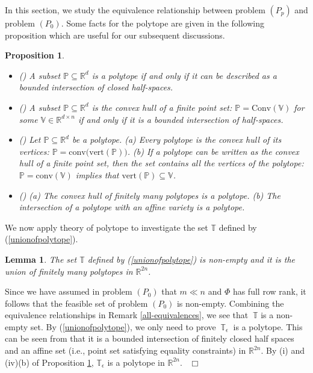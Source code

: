 \documentclass[12pt]{article}
\newtheorem{Proposition}{Proposition}[part]
\newtheorem{Lemma}{Lemma}[part]
\def \ep{\hbox{ }\hfill$\Box$}
\def\reff#1{{\rm(\ref{#1})}}
\begin{document}
\hspace{4mm} In this section, we study the equivalence relationship between problem $(P_p)$ and problem $(P_0)$. Some facts for the polytope are given in the following proposition which are useful for our subsequent discussions.
\begin{Proposition}\label{Representation theorem for polytopes}
\begin{itemize}
\item[(i)] \textrm{\rm (\cite[Theorem 2.15(6)]{Ziegler95bk})}
A subset $\mathbb{P}\subseteq \mathbb{R}^d$ is a polytope if and only if it can be described as a bounded intersection of closed half-spaces.
\item[(ii)] \textrm{\rm (\cite[Theorem 1.1]{Ziegler95bk})}
A subset $\mathbb{P}\subseteq\mathbb{R}^d$ is the convex hull of a finite point set: $\mathbb{P}=\textrm{Conv}(\mathbb{V})$ for some $\mathbb{V}\in\mathbb{R}^{d\times n}$
if and only if it is a bounded intersection of half-spaces.
\item[(iii)] \textrm{\rm (\cite[Proposition 2.2]{Ziegler95bk})}
Let $\mathbb{P}\subseteq \mathbb{R}^d$ be a polytope.
(a) Every polytope is the convex hull of its vertices: $\mathbb{P}=\mathrm{conv(vert}{(\mathbb{P})})$.
(b) If a polytope can be written as the convex hull of a finite point set, then the set contains all the vertices of the polytope:
$\mathbb{P}=\mathrm{conv}(\mathbb{V})$ implies that $\mathrm{vert(\mathbb{P})}\subseteq \mathbb{V}$.
\item[(iv)] \textrm{\rm (\cite[ page32, item 4]{Grunbaum03bk})}
(a) The convex hull of finitely many polytopes is a polytope.
(b) The intersection of a polytope with an affine variety is a polytope.
\end{itemize}
\end{Proposition}

We now apply theory of polytope to investigate the set $\mathbb{T}$ defined by (\ref{unionofpolytope}).

\begin{Lemma}\label{about_T}
The set $\mathbb{T}$ defined by (\ref{unionofpolytope}) is non-empty  and it is  the union  of finitely many
polytopes in $\mathbb{R}^{2n}$.
\end{Lemma}

Since we have assumed in problem $(P_0)$ that $m\ll n$ and $\Phi$ has full row rank, it follows that the feasible set of problem $(P_{0})$ is non-empty. Combining
the equivalence relationships in Remark \ref{all-equivalences}, we see
that $~\mathbb{T}$ is a non-empty set.  By \reff{unionofpolytope},
we only need to prove $~\mathbb{T}_{\epsilon}~$ is a polytope. This
can be seen from that it is a bounded intersection of finitely
closed half spaces and  an affine set (i.e., point set satisfying
equality constraints) in $\mathbb{R}^{2n}$. By (i) and (iv)(b) of Proposition
\ref{Representation theorem for polytopes}, $\mathbb{T}_{\epsilon}$
is a polytope in $\mathbb{R}^{2n}$.
\ep
\end{document}
